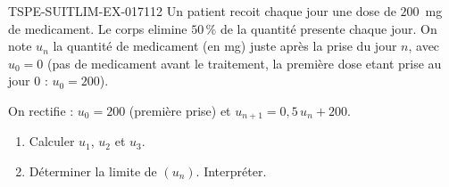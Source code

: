 \begin{exercice}{TSPE-SUITLIM-EX-017}{1}{12}
Un patient recoit chaque jour une dose de $200$~mg de medicament. Le corps elimine $50\,\%$ de la quantité presente chaque jour. On note $u_n$ la quantité de medicament (en mg) juste après la prise du jour $n$, avec $u_0 = 0$ (pas de medicament avant le traitement, la première dose etant prise au jour $0$ : $u_0 = 200$).

On rectifie : $u_0 = 200$ (première prise) et $u_{n+1} = 0{,}5\,u_n + 200$.
\begin{enumerate}
  \item Calculer $u_1$, $u_2$ et $u_3$.
  \item Déterminer la limite de $(u_n)$. Interpréter.
\end{enumerate}
\end{exercice}
